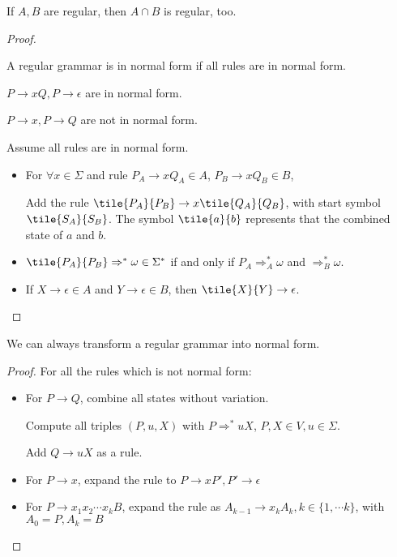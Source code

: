 \begin{theorem}[Common]
If $A, B$ are regular, then \(A \cap B\)
  is regular, too.
\end{theorem}
\begin{proof}
\begin{definition}
 A regular grammar is in normal form if all rules are
in normal form.

\(P \rightarrow xQ, P \rightarrow \epsilon\) are in normal form.

\(P \rightarrow x, P \rightarrow Q\) are not in normal form.
\end{definition}
Assume all rules are in normal form.

  \begin{itemize}
  \item
    For \(\forall x \in \Sigma\) and rule
    \(P_A \rightarrow xQ_A \in A\), \(P_B \rightarrow xQ_B \in B\),

    Add the rule \(\tile{P_A}{P_B} \rightarrow x \tile{Q_A}{Q_B}\),
    with start symbol \(\tile{S_A}{S_B}\). The symbol
    \(\tile{a}{b}\) represents that the combined state of \(a\) and
    \(b\).
  \item
    \(\tile{P_A}{P_B} \Rightarrow^* \omega \in \Sigma^*\) if and only
    if \(P_A \Rightarrow^*_A \omega\) and \(\Rightarrow^*_B \omega\).
  \item
    If \(X \rightarrow \epsilon \in A\) and
    \(Y \rightarrow \epsilon \in B\), then
    \(\tile{X}{Y} \rightarrow \epsilon\).
  \end{itemize}
\end{proof}

\begin{lemma}
We can always transform a regular grammar into normal
form.
\end{lemma}

\begin{proof} For all the rules which is not normal form:
\begin{itemize}
    \item For \(P \rightarrow Q\), combine all states without variation.
    
    Compute all triples $(P,u,X)$ with \(P \Rightarrow^* uX\),
    \(P, X \in V, u \in \Sigma\).
    
    Add \(Q \rightarrow uX\) as a rule.
    \item For \(P \rightarrow x\), expand the rule to
\(P \rightarrow xP', P' \rightarrow \epsilon\)
    \item For \(P \rightarrow x_1x_2\cdots x_kB\), expand the rule as
\(A_{k-1} \rightarrow x_kA_k, k\in \{1, \cdots k\}\), with
\(A_0 = P, A_k = B\)
\end{itemize}

\end{proof}